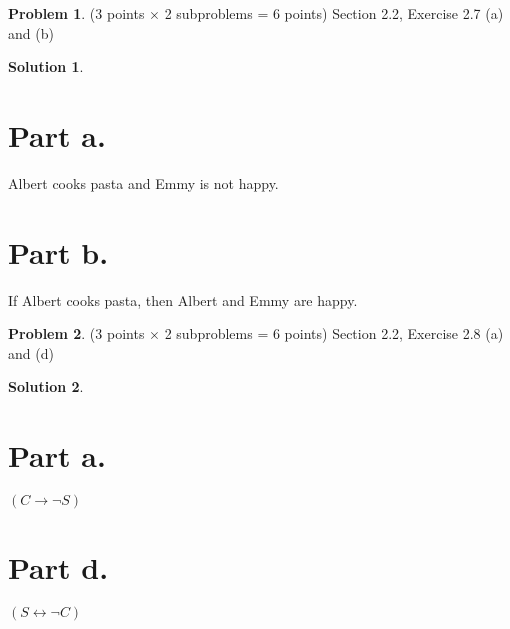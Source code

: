 \documentclass{article}
\theoremstyle{definition}
\newtheorem{problem}{Problem}
\newtheorem*{solution}{Solution}
\begin{document}
\newpage
\begin{problem} (3 points $\times$ 2 subproblems = 6 points) Section 2.2, Exercise 2.7 (a) and (b)
\end{problem}
\begin{solution}
\hspace{1cm}
\section*{Part a.}
Albert cooks pasta and Emmy is not happy.
\section*{Part b.}
If Albert cooks pasta, then Albert and Emmy are happy.
\end{solution}

\newpage
\begin{problem} (3 points $\times$ 2 subproblems = 6 points) Section 2.2, Exercise 2.8 (a) and (d)
\end{problem}
\begin{solution}
\hspace{1cm}
\section*{Part a.}
$(\textit{C} \rightarrow \neg \textit{S})$
\section*{Part d.}
$(\textit{S} \leftrightarrow \neg \textit{C})$
\end{solution}
\end{document}
